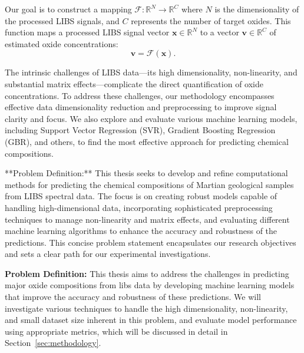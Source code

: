 Our goal is to construct a mapping \(\mathcal{F} : \mathbb{R}^N \rightarrow \mathbb{R}^C\) where \(N\) is the dimensionality of the processed LIBS signals, and \(C\) represents the number of target oxides. This function maps a processed LIBS signal vector \(\mathbf{x} \in \mathbb{R}^N\) to a vector \(\mathbf{v} \in \mathbb{R}^C\) of estimated oxide concentrations:
$$
\mathbf{v} = \mathcal{F}(\mathbf{x}).
$$

The intrinsic challenges of LIBS data—its high dimensionality, non-linearity, and substantial matrix effects—complicate the direct quantification of oxide concentrations. To address these challenges, our methodology encompasses effective data dimensionality reduction and preprocessing to improve signal clarity and focus. We also explore and evaluate various machine learning models, including Support Vector Regression (SVR), Gradient Boosting Regression (GBR), and others, to find the most effective approach for predicting chemical compositions.

**Problem Definition:** This thesis seeks to develop and refine computational methods for predicting the chemical compositions of Martian geological samples from LIBS spectral data. The focus is on creating robust models capable of handling high-dimensional data, incorporating sophisticated preprocessing techniques to manage non-linearity and matrix effects, and evaluating different machine learning algorithms to enhance the accuracy and robustness of the predictions. This concise problem statement encapsulates our research objectives and sets a clear path for our experimental investigations.

\textbf{Problem Definition:} This thesis aims to address the challenges in predicting major oxide compositions from \gls{libs} data by developing machine learning models that improve the accuracy and robustness of these predictions. 
We will investigate various techniques to handle the high dimensionality, non-linearity, and small dataset size inherent in this problem, and evaluate model performance using appropriate metrics, which will be discussed in detail in Section~\ref{sec:methodology}.
